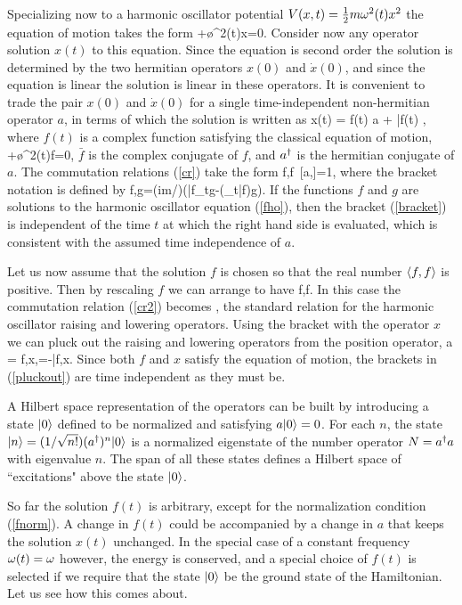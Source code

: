 \documentclass[12pt]{article}
\begin{document}
Specializing now to a harmonic oscillator potential $V(x,t)=\frac{1}{2}
m\omega^2(t)x^2$ the equation of motion takes the form
%
\beq {}+\o^2(t)x=0.\eeq
\label{ho(t)}
%
Consider now any operator solution $x(t)$ to this equation. Since
the equation is second order the solution is determined by the two
hermitian operators $x(0)$ and $\dot{x}(0)$, and since the
equation is linear the solution is linear in these operators. It
is convenient to trade the pair $x(0)$ and $\dot{x}(0)$ for a
single time-independent
non-hermitian operator $a$, in terms of which the solution
is written as
%
\beq x(t) = f(t) a + \bar{f}(t) \ad,\label{xoperator}\eeq
%
where $f(t)$ is a complex function satisfying the classical
equation of motion,
%
\beq {}+\o^2(t)f=0,\label{fho}\eeq
%
$\bar{f}$ is the complex conjugate of $f$, and $a^\dagger$ is the
hermitian conjugate of $a$. The commutation relations (\ref{cr})
take the form
%
\beq \la f,f\ra\, [a,\ad]=1, \label{cr2}\eeq
%
 where the
bracket notation is defined by
%
\beq \la f,g\ra=(im/\hbar)\Bigl(\bar{f}\p_t{g}-(\p_t{\bar{f}})g\Bigr).
\label{bracket}\eeq
%
If the functions $f$ and $g$ are solutions to the harmonic
oscillator equation (\ref{fho}), then the bracket
(\ref{bracket}) is independent of the time $t$ at which the
right hand side is evaluated, which is consistent with the 
assumed time independence of $a$.

Let us now assume that the solution $f$ is chosen so that the 
real number $\langle f,f\rangle$ is positive. Then
by rescaling $f$ we can arrange to have 
\beq
\la f,f.
\label{fnorm}
\eeq
In this case the commutation relation (\ref{cr2}) becomes
%
, \label{cra}\eeq
%
the standard relation
for the harmonic oscillator raising and lowering operators.  
Using the bracket with the operator $x$ we can pluck out the
raising and lowering operators from the position operator,
%
\beq a = \la f,x\ra,\qquad\qquad \ad=-\la\bar{f},x\ra.
\label{pluckout}\eeq
%
Since both $f$ and $x$ satisfy the equation of motion, the
brackets in (\ref{pluckout}) are time independent as they must
be.

A Hilbert space representation of the operators 
can be built by introducing a state $|0\rangle$
defined to be normalized and satisfying $a|0\rangle=0$. 
For each $n$, the state
$|n\rangle=(1/\sqrt{n!})(a^\dagger)^n|0\rangle$ is a normalized
eigenstate of the number operator $N=a^\dagger a$ with
eigenvalue $n$. The span of all these states defines a Hilbert
space of ``excitations" above the
state $|0\rangle$.

So far the solution $f(t)$ is arbitrary, except for the normalization
condition (\ref{fnorm}). A change in $f(t)$ could be accompanied
by a change in $a$ that keeps the solution $x(t)$ unchanged.
In the special case of a constant frequency 
$\omega(t)=\omega$ however, the energy is conserved, and a special choice of $f(t)$
is selected if we require that the state $|0\rangle$ be the
ground state of the Hamiltonian. Let us see how this comes about.
\end{document}
